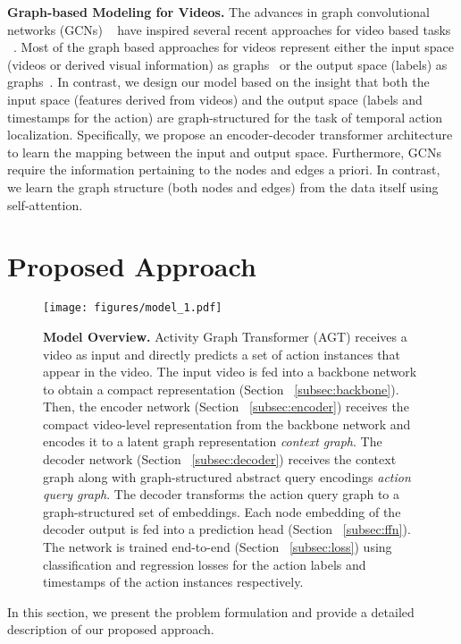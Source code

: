 \documentclass[10pt,twocolumn,letterpaper]{article}
\begin{document}
\vspace{0.05in}
\noindent
\textbf{Graph-based Modeling for Videos.} 
The advances in graph convolutional networks (GCNs) ~\cite{kipf2017semi} have inspired several recent approaches for video based tasks ~\cite{pan2020spatio,wang2018videos,nagarajan2020ego}. Most of the graph based approaches for videos represent either the input space (\ie videos or derived visual information) as graphs~\cite{pan2020spatio,wang2018videos,nagarajan2020ego,hussein2019videograph} or the output space (\ie labels) as graphs~\cite{tsai2019GSTEG}. In contrast, we design our model based on the insight that both the input space (\ie features derived from videos) and the output space (\ie labels and timestamps for the action) are graph-structured for the task of temporal action localization. Specifically, we propose an encoder-decoder transformer architecture to learn the mapping between the input and output space. Furthermore, GCNs require the information pertaining to the nodes and edges a priori. In contrast, we learn the graph structure (\ie both nodes and edges) from the data itself using self-attention. 


 
\section{Proposed Approach}
\begin{figure*}[h]
    \centering
    \texttt{[image: figures/model\_1.pdf]}
    \caption{\textbf{Model Overview.} Activity Graph Transformer (AGT) receives a video as input and directly predicts a set of action instances that appear in the video.
The input video is fed into a backbone network to obtain a compact representation (Section ~\ref{subsec:backbone}). Then, the encoder network (Section ~\ref{subsec:encoder}) receives the compact video-level representation from the backbone network and encodes it to a latent graph representation \textit{context graph}. The decoder network (Section ~\ref{subsec:decoder}) receives the context graph along with graph-structured abstract query encodings \textit{action query graph}. The decoder transforms the action query graph to a graph-structured set of embeddings.
    Each node embedding of the decoder output is fed into a prediction head (Section ~\ref{subsec:ffn}). The network is trained end-to-end (Section ~\ref{subsec:loss}) using classification and regression losses for the action labels and timestamps of the action instances respectively.}
    \label{fig:model}
\end{figure*}
In this section, we present the problem formulation and provide a detailed description of our proposed approach.
\end{document}
